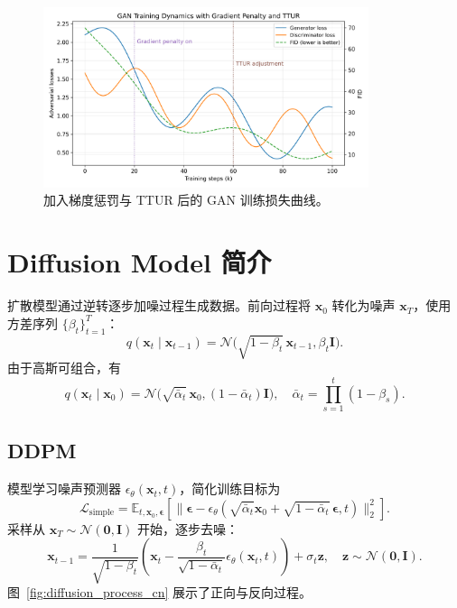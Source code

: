\documentclass[UTF8,zihao=-4]{ctexart}
\begin{document}
\begin{figure}[H]
  \centering
  \includegraphics[width=0.85\textwidth]{gan_training_dynamics.png}
  \caption{加入梯度惩罚与 TTUR 后的 GAN 训练损失曲线。}
  \label{fig:gan_training_dynamics_cn}
\end{figure}
\FloatBarrier

\section{Diffusion Model 简介}
扩散模型通过逆转逐步加噪过程生成数据。前向过程将 $\mathbf{x}_0$ 转化为噪声 $\mathbf{x}_T$，使用方差序列 $\{\beta_t\}_{t=1}^{T}$：
\begin{equation}
  q(\mathbf{x}_t \mid \mathbf{x}_{t-1}) = \mathcal{N}\bigl(\sqrt{1 - \beta_t}\,\mathbf{x}_{t-1}, \beta_t \mathbf{I}\bigr).
\end{equation}
由于高斯可组合，有
\begin{equation}
  q(\mathbf{x}_t \mid \mathbf{x}_0) = \mathcal{N}\bigl(\sqrt{\bar{\alpha}_t}\,\mathbf{x}_0, (1 - \bar{\alpha}_t)\mathbf{I}\bigr), \quad \bar{\alpha}_t = \prod_{s=1}^{t} (1 - \beta_s).
\end{equation}

\subsection{DDPM}
模型学习噪声预测器 $\epsilon_\theta(\mathbf{x}_t, t)$，简化训练目标为
\begin{equation}
  \mathcal{L}_{\mathrm{simple}} = \mathbb{E}_{t, \mathbf{x}_0, \boldsymbol{\epsilon}} \left[ \|\boldsymbol{\epsilon} - \epsilon_\theta(\sqrt{\bar{\alpha}_t}\mathbf{x}_0 + \sqrt{1 - \bar{\alpha}_t}\,\boldsymbol{\epsilon}, t)\|_2^2 \right].
\end{equation}
采样从 $\mathbf{x}_T \sim \mathcal{N}(\mathbf{0}, \mathbf{I})$ 开始，逐步去噪：
\begin{equation}
  \mathbf{x}_{t-1} = \frac{1}{\sqrt{1 - \beta_t}} \left( \mathbf{x}_t - \frac{\beta_t}{\sqrt{1 - \bar{\alpha}_t}} \epsilon_\theta(\mathbf{x}_t, t) \right) + \sigma_t \mathbf{z}, \quad \mathbf{z} \sim \mathcal{N}(\mathbf{0}, \mathbf{I}).
\end{equation}
图~\ref{fig:diffusion_process_cn} 展示了正向与反向过程。
\end{document}
